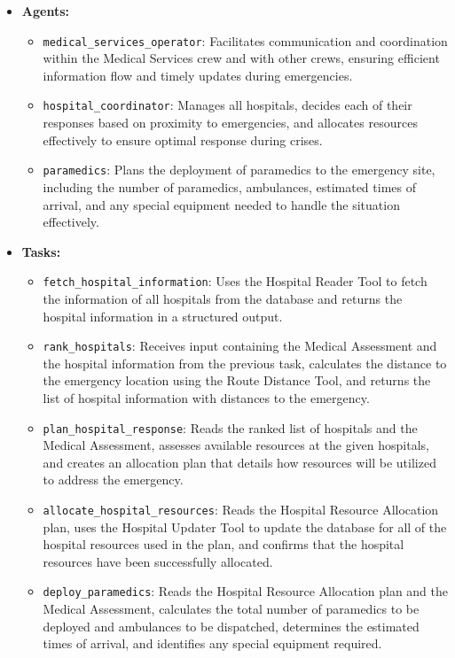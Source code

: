 \begin{itemize}
    \item \textbf{Agents:}
    \begin{itemize}
        \item \texttt{medical\_services\_operator}: Facilitates communication and coordination within the Medical Services crew and with other crews, ensuring efficient information flow and timely updates during emergencies.
        \item \texttt{hospital\_coordinator}: Manages all hospitals, decides each of their responses based on proximity to emergencies, and allocates resources effectively to ensure optimal response during crises.
        \item \texttt{paramedics}: Plans the deployment of paramedics to the emergency site, including the number of paramedics, ambulances, estimated times of arrival, and any special equipment needed to handle the situation effectively.
    \end{itemize}
    \item \textbf{Tasks:}
    \begin{itemize}
        \item \texttt{fetch\_hospital\_information}: Uses the Hospital Reader Tool to fetch the information of all hospitals from the database and returns the hospital information in a structured output.
        \item \texttt{rank\_hospitals}: Receives input containing the Medical Assessment and the hospital information from the previous task, calculates the distance to the emergency location using the Route Distance Tool, and returns the list of hospital information with distances to the emergency.
        \item \texttt{plan\_hospital\_response}: Reads the ranked list of hospitals and the Medical Assessment, assesses available resources at the given hospitals, and creates an allocation plan that details how resources will be utilized to address the emergency.
        \item \texttt{allocate\_hospital\_resources}: Reads the Hospital Resource Allocation plan, uses the Hospital Updater Tool to update the database for all of the hospital resources used in the plan, and confirms that the hospital resources have been successfully allocated.
        \item \texttt{deploy\_paramedics}: Reads the Hospital Resource Allocation plan and the Medical Assessment, calculates the total number of paramedics to be deployed and ambulances to be dispatched, determines the estimated times of arrival, and identifies any special equipment required.

\end{itemize}
\end{itemize}
